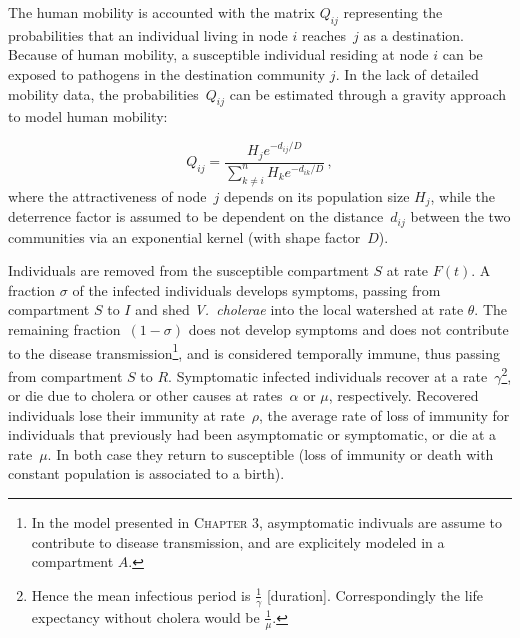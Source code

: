 The human mobility is accounted with the matrix $Q_{ij}$ representing the probabilities that an individual living in node $i$ reaches~$j$ as a destination. Because of human mobility, a susceptible individual residing at node $i$ can be exposed to pathogens in the destination community $j$. 
In the lack of detailed mobility data,  the probabilities~$Q_{ij}$ can be estimated through a gravity approach\cite{Erlander:GravityModelTransportation:1990} to model human mobility:

\begin{equation}
Q_{ij} = \frac{H_j e^{-d_{ij}/D}}{\sum_{k \neq i}^n H_k e^{-d_{ik}/D}} \, ,
\label{eq:mob}
\end{equation}
where the attractiveness of node~$j$ depends on its population size $H_j$, while the deterrence factor is assumed to be dependent on the distance~$d_{ij}$ between the two communities via an exponential kernel (with shape factor~$D$).  

Individuals are removed from the susceptible compartment $S$ at rate $F(t)$.  A fraction $\sigma$ of the infected individuals develops symptoms, passing from compartment $S$ to $I$ and shed \textit{V.~cholerae} into the local watershed at rate $\theta$.  The remaining fraction~$(1-\sigma)$ does not develop symptoms and does not contribute to the disease transmission\footnote{In the model presented in \textsc{Chapter 3}, asymptomatic indivuals are assume to contribute to disease transmission, and are explicitely modeled in a compartment $A$.}, and is considered temporally immune, thus passing from compartment $S$ to $R$.  Symptomatic infected individuals recover at a rate~$\gamma$\footnote{Hence the mean infectious period is $\frac{1}{\gamma}$ [duration]. Correspondingly the life expectancy without cholera would be $\frac{1}{\mu}$.}, or die due to cholera or other causes at rates~$\alpha$ or $\mu$, respectively.
Recovered individuals lose their immunity at rate~$\rho$, the average rate of loss of immunity for individuals that previously had been asymptomatic or symptomatic, or die at a rate~$\mu$. In both case they return to susceptible (loss of immunity or death with constant population is associated to a birth).


